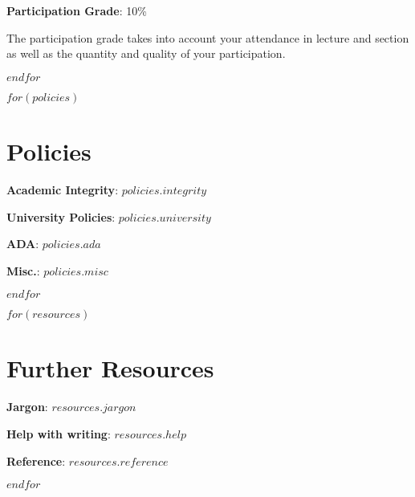 \documentclass[$fontsize$, letterpaper]{article}
\begin{document}
\textbf{Participation Grade}: 10\%
\begin{itemize*}
\item The participation grade takes into account your attendance in lecture and section as well as the quantity and quality of your participation.
\end{itemize*}
$endfor$

$for(policies)$

\section*{Policies}
\begin{itemize*}
\item \textbf{Academic Integrity}: $policies.integrity$
\item \textbf{University Policies}: $policies.university$
\item \textbf{ADA}: $policies.ada$
\item \textbf{Misc.}: $policies.misc$
\end{itemize*}

$endfor$

$for(resources)$

\section*{Further Resources}
\begin{itemize*}
\item \textbf{Jargon}: $resources.jargon$
\item \textbf{Help with writing}: $resources.help$
\item \textbf{Reference}: $resources.reference$
\end{itemize*}

$endfor$
\end{document}
